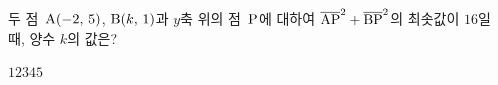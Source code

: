 두 점~$\mathrm{A}(-2,\,5)$, $\mathrm{B}(k,\,1)$과 $y$축 위의 점~$\mathrm{P}$에 대하여 $\overline{\mathrm{AP}}^2+\overline{\mathrm{BP}}^2$의 최솟값이 $16$일 때, 양수 $k$의 값은?
\begin{choices32}{$1$}{$2$}{$3$}{$4$}{$5$}\end{choices32}
